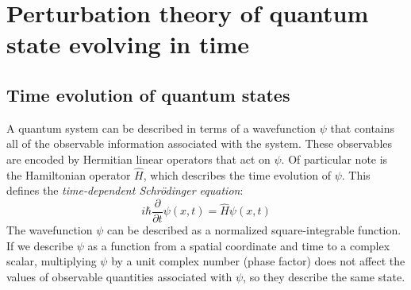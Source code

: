 \section{Perturbation theory of quantum state evolving in time}

\subsection{Time evolution of quantum states}

A quantum system can be described in terms of a wavefunction $\psi$ that contains all of the
observable information associated with the system. These observables are encoded by Hermitian linear
operators that act on $\psi$. Of particular note is the Hamiltonian operator $\hat{H}$, which
describes the time evolution of $\psi$. This defines the \textit{time-dependent Schrödinger
equation}:
\begin{equation}
i \hbar \frac{\partial}{\partial t} \psi\left(x,t\right) = \hat{H}\psi\left(x,t\right) 
\end{equation}
The wavefunction $\psi$ can be described as a normalized square-integrable function. If we describe
$\psi$ as a function from a spatial coordinate and time to a complex scalar, multiplying $\psi$ by
a unit complex number (phase factor) does not affect the values of observable quantities associated
with $\psi$, so they describe the same state.

